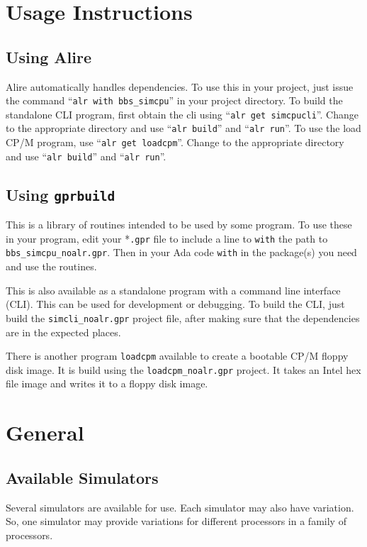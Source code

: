 \documentclass[10pt, openany]{book}
\newcommand{\keyword}[1]{\texttt{#1}}
\begin{document}
\chapter{Usage Instructions}


\section{Using Alire}
Alire automatically handles dependencies.
To use this in your project, just issue the command ``\keyword{alr with bbs\_simcpu}'' in your project directory.
To build the standalone CLI program, first obtain the cli using ``\keyword{alr get simcpucli}''.
Change to the appropriate directory and use ``\keyword{alr build}'' and ``\keyword{alr run}''.
To use the load CP/M program, use ``\keyword{alr get loadcpm}''.
Change to the appropriate directory and use ``\keyword{alr build}'' and ``\keyword{alr run}''.

\section{Using \keyword{gprbuild}}
This is a library of routines intended to be used by some program.
To use these in your program, edit your *\keyword{.gpr} file to include a line to \keyword{with} the path to \keyword{bbs\_simcpu\_noalr.gpr}.
Then in your Ada code \keyword{with} in the package(s) you need and use the routines.

This is also available as a standalone program with a command line interface (CLI).
This can be used for development or debugging.
To build the CLI, just build the \keyword{simcli\_noalr.gpr} project file, after making sure that the dependencies are in the expected places.

There is another program \keyword{loadcpm} available to create a bootable CP/M floppy disk image.
It is build using the \keyword{loadcpm\_noalr.gpr} project.
It takes an Intel hex file image and writes it to a floppy disk image.

\chapter{General}
\section{Available Simulators}
Several simulators are available for use.  Each simulator may also have variation.  So, one simulator may provide variations for different processors in a family of processors.
\end{document}
